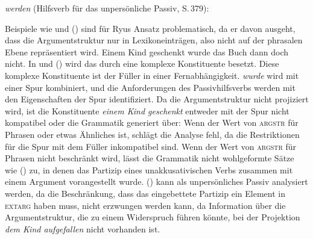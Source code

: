 {\eas
\emph{werden} (Hilfsverb für das unpersönliche Passiv, S.\,379):\\
\zs

\noindent
Beispiele wie  und () sind für
Ryus Ansatz problematisch, da er davon ausgeht, dass die Argumentstruktur
nur in Lexikoneinträgen, also nicht auf der phrasalen Ebene repräsentiert wird.
\ea
Einem Kind    geschenkt wurde das Buch       dann doch      nicht.
\z
In  und () wird das \vf durch eine
komplexe Konstituente besetzt. Diese komplexe Konstituente ist der Füller in einer
Fernabhängigkeit. \emph{wurde} wird mit einer Spur kombiniert, und die Anforderungen
des Passivhilfsverbs werden mit den Eigenschaften der Spur identifiziert.
Da die Argumentstruktur nicht projiziert wird, ist die Konstituente
\emph{einem Kind geschenkt} entweder mit der Spur nicht kompatibel
oder die Grammatik generiert über:
Wenn der Wert von \textsc{argstr} für Phrasen  oder etwas Ähnliches ist,
schlägt die Analyse fehl, da die Restriktionen für die Spur mit dem Füller inkompatibel sind.
Wenn der Wert von \textsc{argstr} für Phrasen nicht beschränkt wird, lässt
die Grammatik nicht wohlgeformte Sätze wie () zu, in denen das Partizip eines
unakkusativischen Verbs zusammen mit einem Argument vorangestellt wurde.
\z
() kann als unpersönliches Passiv analysiert werden, da die Beschränkung,
dass das eingebettete Partizip ein Element in \textsc{extarg} haben muss, nicht 
erzwungen werden kann, da Information über die Argumentstruktur, die zu einem Widerspruch führen
könnte, bei der Projektion \emph{dem Kind aufgefallen} nicht vorhanden ist.




}
